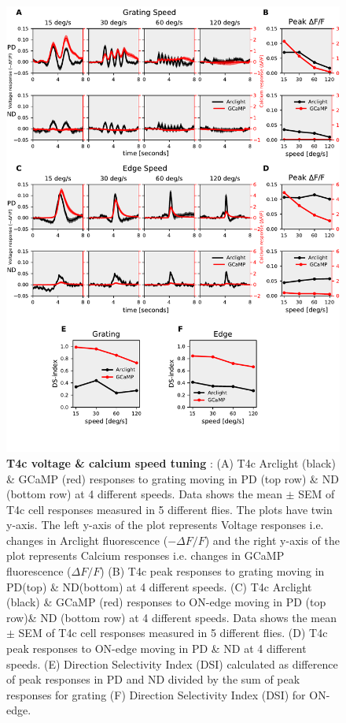 \documentclass[9pt,lineno]{elife}
\begin{document}
\begin{figure}
\begin{fullwidth}
\includegraphics[width=0.84\linewidth]{figure1}
\caption{\textbf{T4c voltage \& calcium speed tuning} : (A) T4c Arclight (black) \& GCaMP (red) responses to grating moving in PD (top row) \& ND (bottom row) at 4 different speeds. Data shows the mean $\pm$ SEM of T4c cell responses measured in 5 different flies. The plots have twin y-axis. The left y-axis of the plot represents Voltage responses i.e. changes in Arclight fluorescence ($-\Delta F/F$) and the right y-axis of the plot represents Calcium responses i.e. changes in GCaMP fluorescence ($\Delta F/F$) (B) T4c peak responses to grating moving in PD(top) \& ND(bottom) at 4 different speeds. (C) T4c Arclight (black) \& GCaMP (red) responses to ON-edge moving in PD (top row)\& ND (bottom row) at 4 different speeds. Data shows the mean $\pm$ SEM of T4c cell responses measured in 5 different flies. (D) T4c peak responses to ON-edge moving in PD \& ND at 4 different speeds. (E) Direction Selectivity Index (DSI) calculated as difference of peak responses in PD and ND divided by the sum of peak responses for grating (F) Direction Selectivity Index (DSI) for ON-edge.}

\label{PDNDspeed}
	
\end{fullwidth}
\end{figure} 
\end{document}
